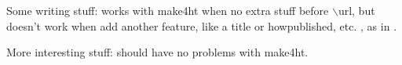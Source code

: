 \documentclass[11pt]{article}
\begin{document}
Some writing stuff: \autocite{trialurl1} works with make4ht when no extra stuff before $\backslash$url, but doesn't work when add another feature, like a title or howpublished, etc.
, as in \cite{trialurl2}.

More interesting stuff: \autocite{vanier} should have no problems with make4ht.

\printbibliography[heading=bibintoc]
\end{document}
